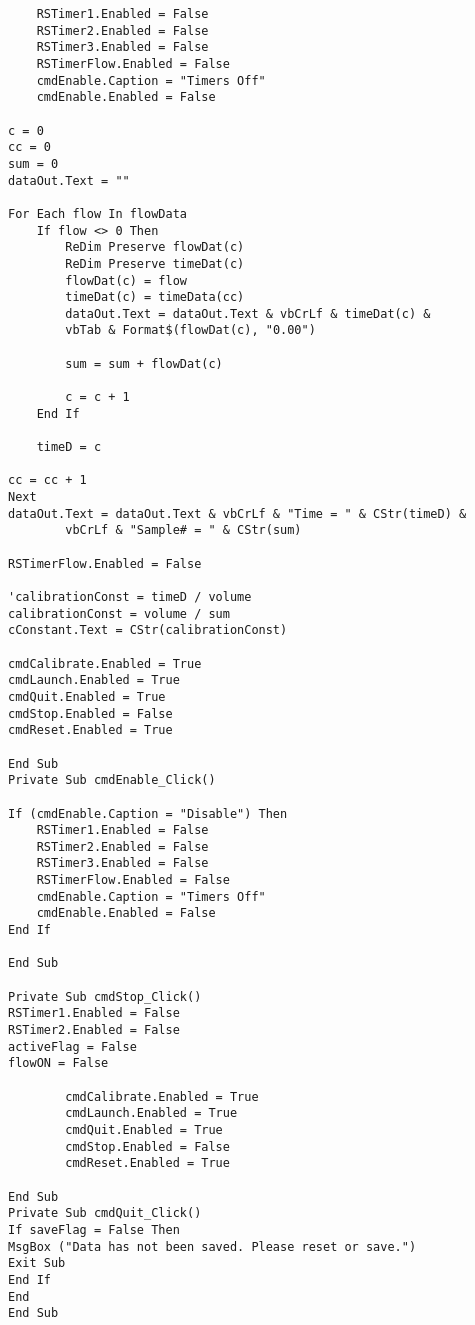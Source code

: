 \begin{singlespace}
\begin{small}
\begin{verbatim}
    RSTimer1.Enabled = False
    RSTimer2.Enabled = False
    RSTimer3.Enabled = False
    RSTimerFlow.Enabled = False
    cmdEnable.Caption = "Timers Off"
    cmdEnable.Enabled = False

c = 0
cc = 0
sum = 0
dataOut.Text = ""

For Each flow In flowData
    If flow <> 0 Then
        ReDim Preserve flowDat(c)
        ReDim Preserve timeDat(c)
        flowDat(c) = flow
        timeDat(c) = timeData(cc)
        dataOut.Text = dataOut.Text & vbCrLf & timeDat(c) & 
		vbTab & Format$(flowDat(c), "0.00")
        
        sum = sum + flowDat(c)
                
        c = c + 1
    End If
    
    timeD = c
    
cc = cc + 1
Next
dataOut.Text = dataOut.Text & vbCrLf & "Time = " & CStr(timeD) & 
		vbCrLf & "Sample# = " & CStr(sum)

RSTimerFlow.Enabled = False

'calibrationConst = timeD / volume
calibrationConst = volume / sum
cConstant.Text = CStr(calibrationConst)
        
cmdCalibrate.Enabled = True
cmdLaunch.Enabled = True
cmdQuit.Enabled = True
cmdStop.Enabled = False
cmdReset.Enabled = True
        
End Sub
Private Sub cmdEnable_Click()

If (cmdEnable.Caption = "Disable") Then
    RSTimer1.Enabled = False
    RSTimer2.Enabled = False
    RSTimer3.Enabled = False
    RSTimerFlow.Enabled = False
    cmdEnable.Caption = "Timers Off"
    cmdEnable.Enabled = False
End If

End Sub

Private Sub cmdStop_Click()
RSTimer1.Enabled = False
RSTimer2.Enabled = False
activeFlag = False
flowON = False

        cmdCalibrate.Enabled = True
        cmdLaunch.Enabled = True
        cmdQuit.Enabled = True
        cmdStop.Enabled = False
        cmdReset.Enabled = True

End Sub
Private Sub cmdQuit_Click()
If saveFlag = False Then
MsgBox ("Data has not been saved. Please reset or save.")
Exit Sub
End If
End
End Sub
\end{verbatim}
\end{small}
\end{singlespace}